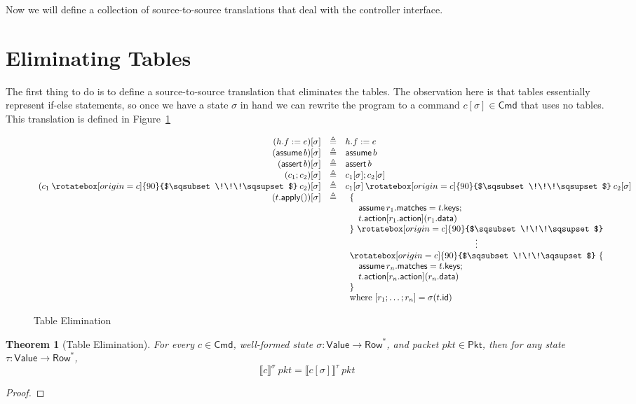 \documentclass{article}
\newcommand{\pkt}{\mathit{pkt}}
\newcommand{\denote}[1]{\llbracket#1\rrbracket}
\newcommand{\Value}{\mathsf{Value}}
\newcommand{\Cmd}{\mathsf{Cmd}}
\newcommand{\Pkt}{\mathsf{Pkt}}
\newcommand{\Row}{\mathsf{Row}}
\newcommand{\matches}{\mathsf{matches}}
\newcommand{\action}{\mathsf{action}}
\newcommand{\keys}{\mathsf{keys}}
\newcommand{\data}{\mathsf{data}}
\newcommand{\id}{\mathsf{id}}
\newcommand{\assert}{\mathop{\mathsf{assert}}}
\newcommand{\assume}{\mathop{\mathsf{assume}}}
\newcommand{\apply}{\mathsf{apply}}
\newcommand{\choice}{\mathbin{\rotatebox[origin=c]{90}{$\sqsubset\!\!\!\sqsupset$}}}
\newtheorem{theorem}{Theorem}
\begin{document}
Now we will define a collection of source-to-source translations that deal with
the controller interface.

\section{Eliminating Tables}

The first thing to do is to define a source-to-source translation that
eliminates the tables. The observation here is that tables essentially represent
if-else statements, so once we have a state $\sigma$ in hand we can rewrite the
program to a command $c[\sigma] \in \Cmd$ that uses no tables. This translation
is defined in Figure~\ref{fig:table-elim}

\begin{figure}
  \[\begin{array}{r>{\triangleq}cl}
  (h.f := e)[\sigma] && h.f := e   \\
  (\assume b)[\sigma] && \assume b \\
  (\assert b)[\sigma] && \assert b \\
  (c_1;c_2)[\sigma] && c_1[\sigma];c_2[\sigma] \\
  (c_1 \choice c_2)[\sigma] && c_1[\sigma] \choice c_2[\sigma] \\
  (t.\apply())[\sigma] &&
  \begin{array}[t]{l}
    \{\\
    \quad \assume {r_1.\matches = t.\keys};\\
    \quad t.\action[r_1.\action](r_1.\data)\\
    \}~\choice\\
    \multicolumn{1}{c}{\vdots}\\
    \choice~\{\\
    \quad \assume {r_n.\matches = t.\keys};\\
    \quad t.\action[r_n.\action](r_n.\data)\\
    \}\\
    \textrm{where}~[r_1;\ldots;r_n] = \sigma(t.\id)
  \end{array}
  \end{array}
  \]
  \caption{Table Elimination}
  \label{fig:table-elim}
\end{figure}


\begin{theorem}[Table Elimination]
  For every $c \in \Cmd$, well-formed state $\sigma : \Value \to \Row^*$,
  and packet $\pkt \in \Pkt$, then for any state $\tau : \Value \to \Row^*$,
  \[\denote{c}^\sigma~\pkt = \denote{c[\sigma]}^\tau~\pkt\]
\end{theorem}
\begin{proof}
\end{proof}
\end{document}
